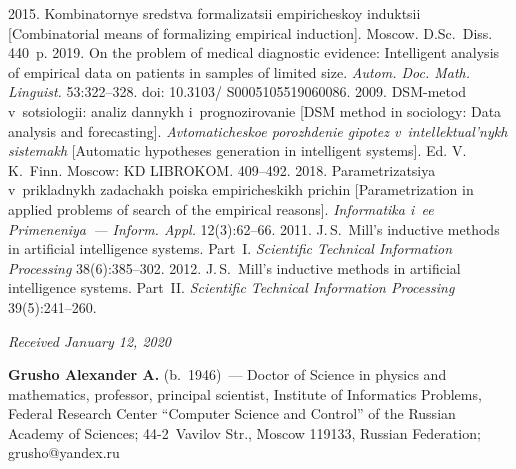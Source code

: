 \begin{multicols}{2}
{{\begin{thebibliography}{99}
 2015. Kombinatornye sredstva for\-ma\-li\-za\-tsii empiricheskoy induktsii 
[Combinatorial means of formalizing empirical induction]. 
 Moscow. D.Sc.\ Diss. 440~p.
 2019. 
%
On the problem of medical diagnostic evidence: 
Intelligent analysis of empirical data on patients in samples of limited size. 
\textit{Autom. Doc. Math. Linguist.} 53:322--328. 
doi: 10.3103/ S0005105519060086.
 2009. DSM-metod v~sotsiologii: analiz dannykh 
i~prognozirovanie [DSM method in sociology: Data analysis and forecasting]. 
\textit{Av\-to\-ma\-ti\-che\-skoe porozhdenie gipotez v~intellektual'nykh sistemakh} [Automatic hypotheses 
generation in intelligent systems]. Ed. V.\,K.~Finn. Moscow: KD LIBROKOM. 409--492.
 2018. 
Parametrizatsiya v~prikladnykh zadachakh poiska empiricheskikh prichin [Parametrization in applied 
problems of search of the empirical reasons]. \textit{Informatika i~ee Primeneniya~--- Inform. Appl.} 
12(3):62--66.
 2011. J.\,S.~Mill's 
inductive methods in artificial intelligence systems. Part~I. 
\textit{Scientific Technical Information Processing} 38(6):385--302. 
 2012. J.\,S.~Mill's 
inductive methods in artificial intelligence systems. Part~II. 
\textit{Scientific Technical Information Processing} 39(5):241--260.
\end{thebibliography}

 }
 }

\end{multicols}


\hfill{\small\textit{Received January 12, 2020}}




\Contr

\noindent
\textbf{Grusho Alexander A.} (b.\ 1946)~--- 
Doctor of Science in physics and mathematics, professor, principal scientist, Institute of Informatics 
Problems, Federal Research Center ``Computer Science and Control'' of the Russian Academy of 
Sciences; 44-2~Vavilov Str., Moscow 119133, Russian Federation;  \mbox{grusho@yandex.ru}

